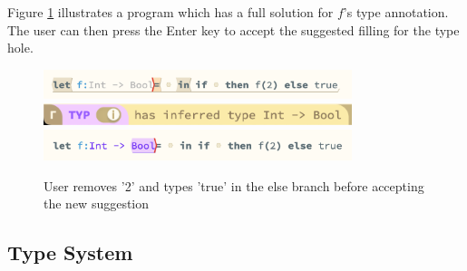Figure \ref{fig:editor_ghost} illustrates a program which has a full solution for $f$'s type annotation. The user can then press the Enter key to accept the suggested filling for the type hole.
\begin{figure}[H]
\includegraphics[width=9cm]{images/example_ghost.png}
\includegraphics[width=9cm]{images/example_complete_CI.png}
\includegraphics[width=9cm]{images/example_complete.png}
\caption{User removes '2' and types 'true' in the else branch before accepting the new suggestion}
\label{fig:editor_ghost}
\end{figure}

\subsection{Type System}

